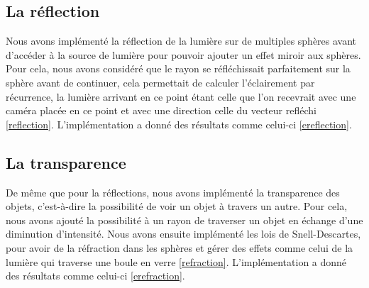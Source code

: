 \subsection{La réflection}
Nous avons implémenté la réflection de la lumière sur de multiples sphères avant d'accéder à la source de lumière pour pouvoir ajouter un effet miroir aux sphères. Pour cela, nous avons considéré que le rayon se réfléchissait parfaitement sur la sphère avant de continuer, cela permettait de calculer l'éclairement par récurrence, la lumière arrivant en ce point étant celle que l'on recevrait avec une caméra placée en ce point et avec une direction celle du vecteur refléchi \ref{reflection}.
L'implémentation a donné des résultats comme celui-ci \ref{ereflection}.

\subsection{La transparence}
De même que pour la réflections, nous avons implémenté la transparence des objets, c'est-à-dire la possibilité de voir un objet à travers un autre. Pour cela, nous avons ajouté la possibilité à un rayon de traverser un objet en échange d'une diminution d'intensité. Nous avons ensuite implémenté les lois de Snell-Descartes, pour avoir de la réfraction dans les sphères et gérer des effets comme celui de la lumière qui traverse une boule en verre \ref{refraction}.
L'implémentation a donné des résultats comme celui-ci \ref{erefraction}.
